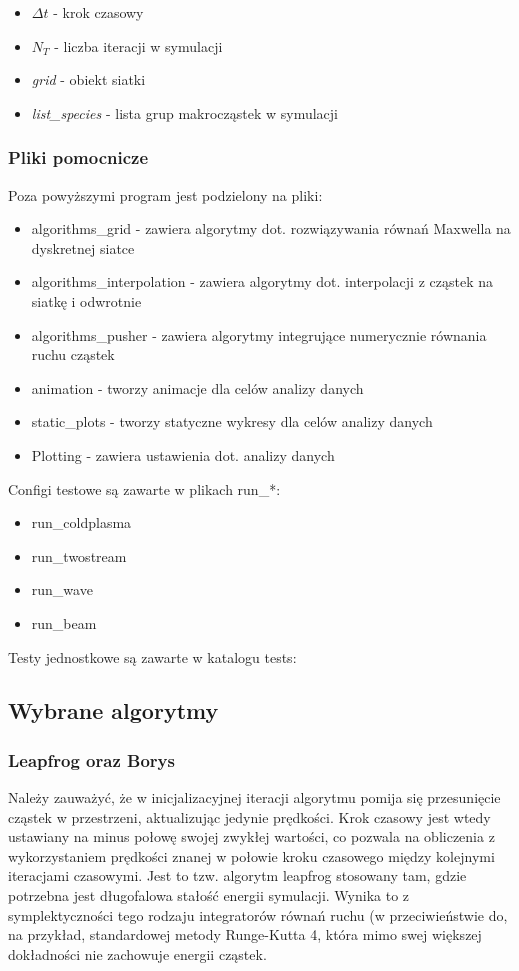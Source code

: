\begin{itemize}
\item $\Delta t$ - krok czasowy
\item $N_T$ - liczba iteracji w symulacji
\item \emph{grid} - obiekt siatki
\item \emph{list\_species} - lista grup makrocząstek w symulacji
\end{itemize}

\subsubsection{Pliki pomocnicze}
Poza powyższymi program jest podzielony na pliki:
\begin{itemize}
\item algorithms\_grid - zawiera algorytmy dot. rozwiązywania równań Maxwella na dyskretnej siatce
\item algorithms\_interpolation - zawiera algorytmy dot. interpolacji z cząstek na siatkę i odwrotnie
\item algorithms\_pusher - zawiera algorytmy integrujące numerycznie równania ruchu cząstek
\item animation - tworzy animacje dla celów analizy danych
\item static\_plots - tworzy statyczne wykresy dla celów analizy danych
\item Plotting - zawiera ustawienia dot. analizy danych %
\end{itemize}

Configi testowe są zawarte w plikach run\_*: %
\begin{itemize}
\item run\_coldplasma
\item run\_twostream
\item run\_wave
\item run\_beam
\end{itemize}

Testy jednostkowe są zawarte w katalogu tests:

\subsection{Wybrane algorytmy}

\subsubsection{Leapfrog oraz Borys} %
Należy zauważyć, że w inicjalizacyjnej iteracji algorytmu pomija się przesunięcie cząstek w przestrzeni, aktualizując jedynie
prędkości. Krok czasowy jest wtedy ustawiany na minus połowę swojej zwykłej wartości, co pozwala na obliczenia
z wykorzystaniem prędkości znanej w połowie kroku czasowego między kolejnymi iteracjami czasowymi. Jest to tzw. algorytm
leapfrog %
stosowany tam, gdzie potrzebna jest długofalowa stałość energii symulacji. Wynika to z symplektyczności %
tego rodzaju integratorów równań ruchu (w przeciwieństwie do, na przykład, standardowej metody Runge-Kutta 4, która
mimo swej większej dokładności nie zachowuje energii cząstek.

